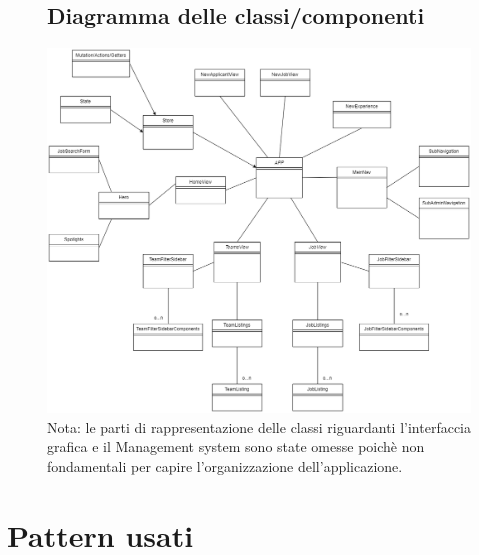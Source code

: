 \documentclass[ 4paper,11pt,openany]{book}
\begin{document}
\begin{figure}[htpb!] 
	\section{Diagramma delle classi/componenti}
	\centering 
	\includegraphics[width=185mm]{Complete_Class_diagram.png}
	Nota: le parti di rappresentazione delle classi riguardanti l'interfaccia grafica e il Management system sono state omesse poichè non fondamentali per capire l'organizzazione dell'applicazione.
\end{figure}
	
\chapter{Pattern usati}
\end{document}
